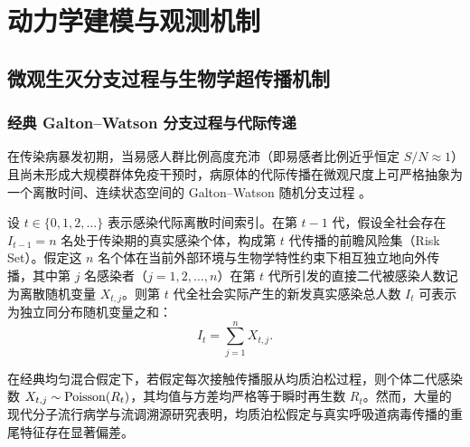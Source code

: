 \chapter{动力学建模与观测机制}\label{ch:mechanism}

\section{微观生灭分支过程与生物学超传播机制}\label{sec:branching}

\subsection{经典 Galton--Watson 分支过程与代际传递}
在传染病暴发初期，当易感人群比例高度充沛（即易感者比例近乎恒定 $S/N \approx 1$）且尚未形成大规模群体免疫干预时，病原体的代际传播在微观尺度上可严格抽象为一个离散时间、连续状态空间的 Galton--Watson 随机分支过程 \citep{harris1963theory,jagers1975branching}。

设 $t \in \{0, 1, 2, \dots\}$ 表示感染代际离散时间索引。在第 $t-1$ 代，假设全社会存在 $I_{t-1} = n$ 名处于传染期的真实感染个体，构成第 $t$ 代传播的前瞻风险集（Risk Set）。假定这 $n$ 名个体在当前外部环境与生物学特性约束下相互独立地向外传播，其中第 $j$ 名感染者（$j = 1, 2, \dots, n$）在第 $t$ 代所引发的直接二代被感染人数记为离散随机变量 $X_{t,j}$。则第 $t$ 代全社会实际产生的新发真实感染总人数 $I_t$ 可表示为独立同分布随机变量之和：
\begin{equation}
I_t = \sum_{j=1}^n X_{t,j}. \label{eq:branching_sum}
\end{equation}

在经典均匀混合假定下，若假定每次接触传播服从均质泊松过程，则个体二代感染数 $X_{t,j} \sim \operatorname{Poisson}(R_t)$，其均值与方差均严格等于瞬时再生数 $R_t$。然而，大量的现代分子流行病学与流调溯源研究表明，均质泊松假定与真实呼吸道病毒传播的重尾特征存在显著偏差。

